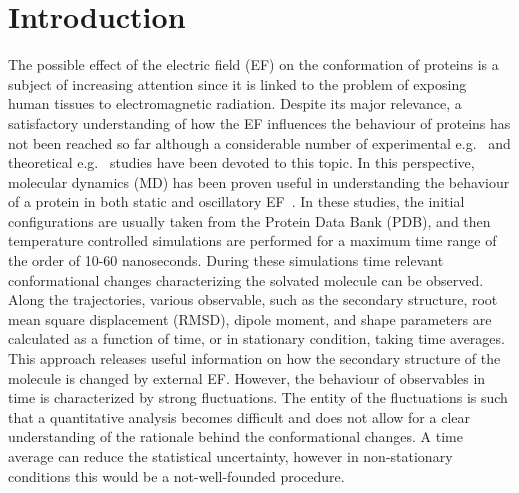 \documentclass[journal=jctcce,manuscript=manuscript]{achemso}
\begin{document}


\section{Introduction}
The possible effect of the electric field (EF) on the conformation of
proteins is a subject of increasing attention since it is linked to the problem of exposing human tissues to
electromagnetic radiation. Despite its major relevance, a
satisfactory understanding of how the EF influences the behaviour of proteins
has not been reached so far although a considerable number of
experimental e.g.~\cite{bohr2000microwave, bohr2000microwave-1,
  dePomerai2000cell, inskip2001cellular, mancinelli2004non} and
theoretical e.g.~\cite{budi2005electric, budi2007effect,
  budi2008comparative, toschi2008effects, astrakas2011electric,
  astrakas2012structural, damm2012can, starzyk2013proteins,
  english2009nonequilibrium, solomentsev2012effects}
studies have been devoted to this topic.
In this perspective, molecular dynamics (MD) has been proven useful in
understanding the behaviour of a protein 
in both static and oscillatory EF~\cite{budi2005electric, budi2007effect, budi2008comparative,
  toschi2008effects, astrakas2011electric, astrakas2012structural,
  damm2012can, starzyk2013proteins, english2009nonequilibrium,
  solomentsev2012effects}. In these studies, the initial
configurations are usually taken from the Protein Data Bank (PDB),
and then temperature controlled simulations are performed for a maximum
time range of the order of 10-60 nanoseconds.
During these simulations time 
relevant conformational changes characterizing the solvated molecule can be observed. 
Along the trajectories, various observable, such as the
secondary structure, root mean square displacement (RMSD), dipole
moment, and shape parameters are calculated as a function of time, or
in stationary condition, taking time averages.
This approach releases useful information on how the
secondary structure of the molecule is changed by external  EF.  However,
the behaviour of observables in time is characterized by 
strong
fluctuations. The entity of the fluctuations is such that a quantitative 
analysis becomes difficult and does not allow for  a clear understanding of the rationale behind the conformational changes.
A time average can reduce the statistical uncertainty,
however in non-stationary conditions this would be a not-well-founded procedure.
\end{document}
